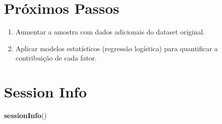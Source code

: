 \documentclass[
]{article}
\newenvironment{Shaded}{\begin{snugshade}}{\end{snugshade}}
\newcommand{\FunctionTok}[1]{\textcolor[rgb]{0.13,0.29,0.53}{\textbf{#1}}}
\newcommand{\NormalTok}[1]{#1}
\providecommand{\tightlist}{%
  \setlength{\itemsep}{0pt}\setlength{\parskip}{0pt}}
\begin{document}
\section{Próximos Passos}\label{next}

\begin{enumerate}
\def\labelenumi{\arabic{enumi}.}
\tightlist
\item
  Aumentar a amostra com dados adicionais do dataset original.\\
\item
  Aplicar modelos estatísticos (regressão logística) para quantificar a
  contribuição de cada fator.
\end{enumerate}

\section{Session Info}\label{session-info}

\begin{Shaded}
\begin{Highlighting}[]
\FunctionTok{sessionInfo}\NormalTok{()}
\end{Highlighting}
\end{Shaded}
\end{document}
